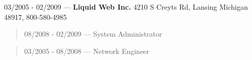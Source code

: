 03/2005 - 02/2009 --- {\bf Liquid Web Inc.} 4210 S Creyts Rd, Lansing Michigan 48917, 800-580-4985
\begin{quote}
08/2008 - 02/2009 --- System Administrator
\end{quote}
\begin{quote}
03/2005 - 08/2008 --- Network Engineer
\end{quote}

